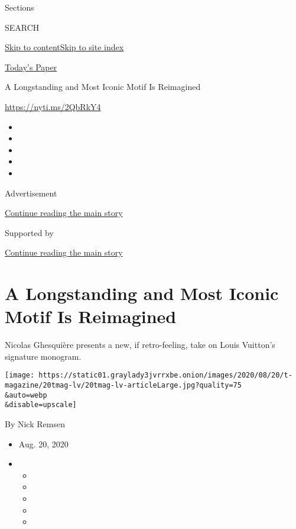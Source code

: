 Sections

SEARCH

\protect\hyperlink{site-content}{Skip to
content}\protect\hyperlink{site-index}{Skip to site index}

\href{https://myaccount.nytimes3xbfgragh.onion/auth/login?response_type=cookie\&client_id=vi}{}

\href{https://www.nytimes3xbfgragh.onion/section/todayspaper}{Today's
Paper}

A Longstanding and Most Iconic Motif Is Reimagined

\url{https://nyti.ms/2QbRkY4}

\begin{itemize}
\item
\item
\item
\item
\item
\end{itemize}

Advertisement

\protect\hyperlink{after-top}{Continue reading the main story}

Supported by

\protect\hyperlink{after-sponsor}{Continue reading the main story}

\hypertarget{a-longstanding-and-most-iconic-motif-is-reimagined}{%
\section{A Longstanding and Most Iconic Motif Is
Reimagined}\label{a-longstanding-and-most-iconic-motif-is-reimagined}}

Nicolas Ghesquière presents a new, if retro-feeling, take on Louis
Vuitton's signature monogram.

\texttt{[image: https://static01.graylady3jvrrxbe.onion/images/2020/08/20/t-magazine/20tmag-lv/20tmag-lv-articleLarge.jpg?quality=75\\\&auto=webp\\\&disable=upscale]}

By Nick Remsen

\begin{itemize}
\item
  Aug. 20, 2020
\item
  \begin{itemize}
  \item
  \item
  \item
  \item
  \item
  \end{itemize}
\end{itemize}


